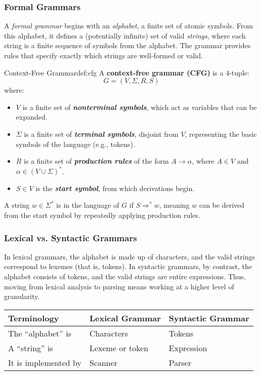 \documentclass[12pt,a4paper]{article}
\newcommand{\bemph}[1]{\textbf{\emph{#1}}}
\begin{document}
\subsubsection{Formal Grammars}
A \emph{formal grammar} begins with an \emph{alphabet}, a finite set of atomic symbols. From this alphabet, it defines a
(potentially infinite) set of valid \emph{strings}, where each string is a finite sequence of symbols from
the alphabet. The grammar provides rules that specify exactly which strings are well-formed or valid.

\begin{definition}{Context-Free Grammar}{def:cfg}\label{def:cfg}
	A \textbf{context-free grammar (CFG)} is a 4-tuple:
	\[
		G = (V, \Sigma, R, S)
	\]
	where:
	\begin{itemize}
		\item \(V\) is a finite set of \bemph{nonterminal symbols}, which act as variables that can be expanded.
		\item \(\Sigma\) is a finite set of \bemph{terminal symbols}, disjoint from \(V\), representing the basic symbols of the language (e.g., tokens).
		\item \(R\) is a finite set of \bemph{production rules} of the form \(A \rightarrow \alpha\), where \(A \in V\) and \(\alpha \in (V \cup \Sigma)^*\).
		\item \(S \in V\) is the \bemph{start symbol}, from which derivations begin.
	\end{itemize}
	A string \(w \in \Sigma^*\) is in the language of \(G\) if \(S \Rightarrow^* w\), meaning \(w\) can be derived from the start symbol by repeatedly applying production rules.
\end{definition}

\subsubsection{Lexical vs. Syntactic Grammars}
In lexical grammars, the alphabet is made up of characters, and the valid strings correspond to lexemes (that is, tokens). In syntactic grammars, by contrast, the alphabet consists of tokens, and the valid strings are entire expressions. Thus, moving from lexical analysis to parsing means working at a higher level of granularity.

\begin{center}
	\begin{tabular}{|l|l|l|}
		\hline
		\textbf{Terminology} & \textbf{Lexical Grammar} & \textbf{Syntactic Grammar} \\
		\hline
		The ``alphabet'' is  & Characters               & Tokens                     \\
		A ``string'' is      & Lexeme or token          & Expression                 \\
		It is implemented by & Scanner                  & Parser                     \\
		\hline
	\end{tabular}
\end{center}
\end{document}
